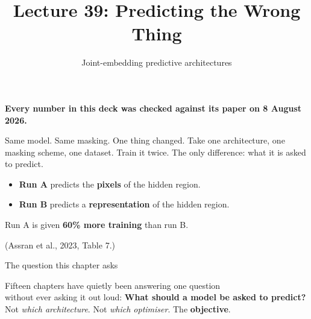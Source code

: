 \documentclass[aspectratio=169]{beamer}
\title{Lecture 39: Predicting the Wrong Thing}
\subtitle{Joint-embedding predictive architectures}
\date{}
\begin{document}
\begin{frame}
  \titlepage
  \vskip -8pt
  \begin{center}
    \footnotesize\color{armred}\textbf{Every number in this deck was checked against its
    paper on 8 August 2026.}
  \end{center}
\end{frame}

\begin{frame}{Same model. Same masking. One thing changed.}
  \small
  Take one architecture, one masking scheme, one dataset. Train it twice. The only
  difference: what it is asked to predict.
  \vskip 6pt
  \begin{itemize}
    \item \textbf{Run A} predicts the \textbf{pixels} of the hidden region.
    \item \textbf{Run B} predicts a \textbf{representation} of the hidden region.
  \end{itemize}
  \vskip 8pt
  Run A is given \textbf{60\% more training} than run B.
  \vskip 10pt
  \pause
  \begin{center}
  \end{center}
  \vskip 4pt
  \footnotesize\centering (Assran et al., 2023, Table 7.)
\end{frame}

\begin{frame}{The question this chapter asks}
  \large
  \begin{center}
    \vskip 10pt
    Fifteen chapters have quietly been answering one question\\ without ever asking it
    out loud:
    \vskip 16pt
    {\color{popblue}\textbf{What should a model be asked to predict?}}
    \vskip 16pt
    \normalsize
    Not \emph{which architecture}. Not \emph{which optimiser}. The \textbf{objective}.
  \end{center}
\end{frame}
\end{document}
